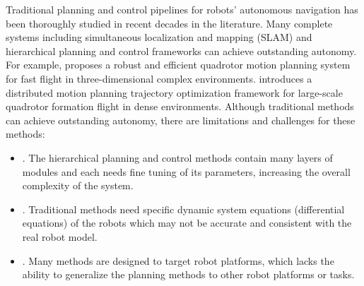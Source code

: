 \documentclass[letterpaper,journal,twoside]{IEEEtran}
\begin{document}
Traditional planning and control pipelines for robots' 
autonomous navigation has been thoroughly studied in recent
decades in the literature. 
Many complete systems including simultaneous localization 
and mapping (SLAM) and hierarchical 
planning and control frameworks can achieve outstanding 
autonomy.
For example, \cite{zhou2019robust} proposes a robust and efficient 
quadrotor motion planning system for fast flight in 
three-dimensional complex environments.
\cite{quan2023robust} introduces a distributed motion planning 
trajectory optimization framework for large-scale quadrotor 
formation flight in dense environments.
Although traditional methods can achieve outstanding
autonomy, there are limitations and challenges for these methods: 
\begin{itemize}
  \item {}. The hierarchical planning and control 
  methods contain many layers of modules and 
  each needs fine tuning of 
  its parameters, increasing the overall complexity of the system.
  \item {}. Traditional methods need specific 
  dynamic system equations (differential equations) of the 
  robots which may not be accurate and consistent with the real 
  robot model.
  \item {}. Many methods are 
  designed to target robot platforms, which lacks the ability
  to generalize the planning methods to other robot platforms
  or tasks.
\end{itemize}
\end{document}
